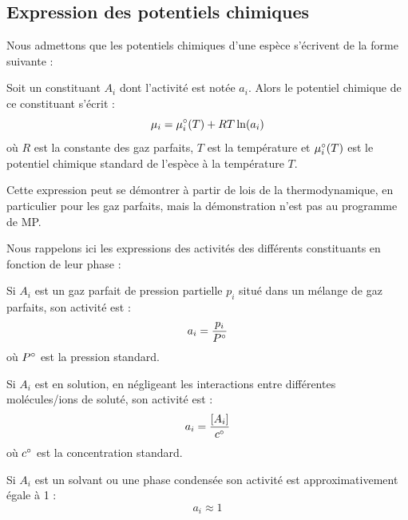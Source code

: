 \documentclass[11pt,fleqn]{book} %
\begin{document}
\subsection{Expression des potentiels chimiques}

Nous admettons que les potentiels chimiques d'une espèce s'écrivent de la forme suivante :
\begin{proposition}
    Soit un constituant $A_i$ dont l'activité est notée $a_i$. Alors le potentiel chimique de ce constituant s'écrit :
    \begin{equation}
        \mu_i = \mu_i\degree(T) + RT \ln(a_i)
    \end{equation}
    où $R$ est la constante des gaz parfaits, $T$ est la température et $\mu_i\degree(T)$ est le potentiel chimique standard de l'espèce à la température $T$.
\end{proposition}
\begin{remark}
    Cette expression peut se démontrer à partir de lois de la thermodynamique, en particulier pour les gaz parfaits, mais la démonstration n'est pas au programme de MP.
\end{remark}

Nous rappelons ici les expressions des activités des différents constituants en fonction de leur phase :
\begin{proposition}
    Si $A_i$ est un gaz parfait de pression partielle $p_i$ situé dans un mélange de gaz parfaits, son activité est :
    \begin{equation}
        a_i = \frac{p_i}{P\degree}
    \end{equation}
    où $P\degree$ est la pression standard.
\end{proposition}
\begin{proposition}
    Si $A_i$ est en solution, en négligeant les interactions entre différentes molécules/ions de soluté, son activité est :
    \begin{equation}
        a_i = \frac{[A_i]}{c\degree}
    \end{equation}
    où $c\degree$ est la concentration standard.
\end{proposition}
\begin{proposition}
    Si $A_i$ est un solvant ou une phase condensée son activité est approximativement égale à 1 :
    \begin{equation}
        a_i \approx 1
    \end{equation}
\end{proposition}
\end{document}

